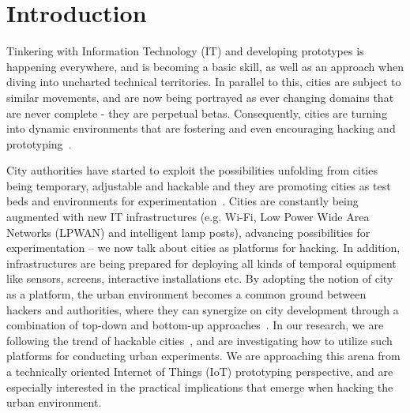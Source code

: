 \section{Introduction}

Tinkering with Information Technology (IT) and developing prototypes is happening everywhere, and is becoming a basic skill, as well as an approach when diving into uncharted technical territories. In parallel to this, cities are subject to similar movements, and are now being portrayed as ever changing domains that are never complete - they are perpetual betas. Consequently, cities are turning into dynamic environments that are fostering and even encouraging hacking and prototyping~\cite{Fredericks2019}.

City authorities have started to exploit the possibilities unfolding from cities being temporary, adjustable and hackable and they are promoting cities as test beds and environments for experimentation~\cite{Latre2016}. Cities are constantly being augmented with new IT infrastructures (e.g. Wi-Fi, Low Power Wide Area Networks (LPWAN) and intelligent lamp posts), advancing possibilities for experimentation -- we now talk about cities as platforms for hacking. In addition, infrastructures are being prepared for deploying all kinds of temporal equipment like sensors, screens, interactive installations etc. By adopting the notion of city as a platform, the urban environment becomes a common ground between hackers and authorities, where they can synergize on city development through a combination of top-down and bottom-up approaches~\cite{Mulder2019}. In our research, we are following the trend of hackable cities~\cite{2019}, and are investigating how to utilize such platforms for conducting urban experiments. We are approaching this arena from a technically oriented Internet of Things (IoT) \cite{Ghasempour2016} prototyping perspective, and are especially interested in the practical implications that emerge when hacking the urban environment.

